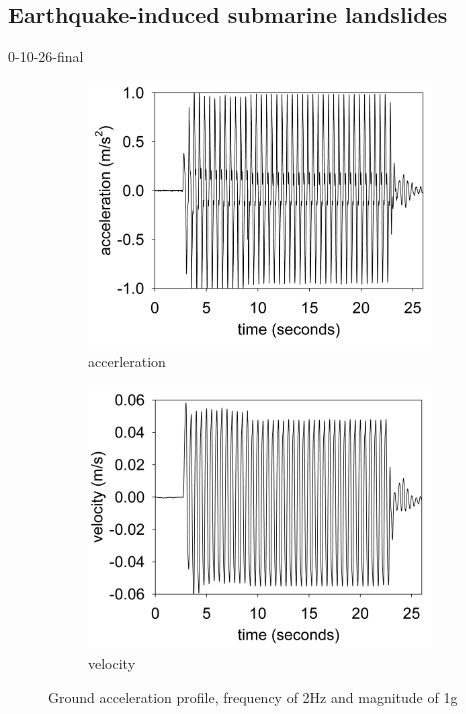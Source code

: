 \documentclass[preprint,12pt]{elsarticle}
\begin{document}
\subsection{\textsf{Earthquake-induced submarine landslides}}
0-10-26-final
%
%
\begin{figure}[h]
\center
\begin{subfigure}[c]{0.5\linewidth}
\includegraphics[width=\linewidth]{acer.jpg}
\caption{accerleration}
\end{subfigure}\hfill    
\begin{subfigure}[d]{0.5\linewidth}
\includegraphics[width=\linewidth]{vel.jpg}
\caption{velocity}
\label{velocity}
\end{subfigure}
\caption{Ground acceleration profile, frequency of 2Hz and magnitude of 1g}
\end{figure}
%
%
\end{document}
